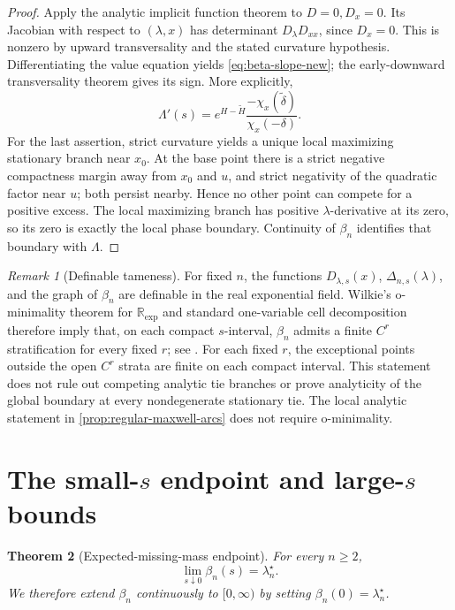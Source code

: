\documentclass[11pt]{article}
\theoremstyle{plain}
\newtheorem{theorem}{Theorem}[section]
\theoremstyle{definition}
\theoremstyle{remark}
\newtheorem{remark}[theorem]{Remark}
\newcommand{\R}{\mathbb R}
\begin{document}
\begin{proof}
Apply the analytic implicit function theorem to \(D=0,D_x=0\).  Its Jacobian
with respect to \((\lambda,x)\) has determinant \(D_\lambda D_{xx}\), since
\(D_x=0\).  This is nonzero by upward transversality and the stated curvature
hypothesis.  Differentiating the value equation yields \eqref{eq:beta-slope-new};
the early-downward transversality theorem gives its sign.  More explicitly,
\begin{equation}\label{eq:beta-slope-chi}
\Lambda'(s)=e^{H-\widetilde H}
\frac{-\chi_x(\widetilde\delta)}{\chi_x(-\delta)}.
\end{equation}
For the last assertion, strict curvature yields a unique local maximizing
stationary branch near \(x_0\).  At the base point there is a strict negative
compactness margin away from \(x_0\) and \(u\), and strict negativity of the
quadratic factor near \(u\); both persist nearby.  Hence no other point can
compete for a positive excess.  The local maximizing branch has positive
\(\lambda\)-derivative at its zero, so its zero is exactly the local phase
boundary.  Continuity of \(\beta_n\) identifies that boundary with \(\Lambda\).
\end{proof}

\begin{remark}[Definable tameness]\label{rem:definable}
For fixed \(n\), the functions \(D_{\lambda,s}(x)\), \(\Delta_{n,s}(\lambda)\), and the graph of \(\beta_n\) are definable in the real exponential field.  Wilkie's o-minimality theorem for \(\R_{\exp}\) and standard one-variable cell decomposition therefore imply that, on each compact \(s\)-interval, \(\beta_n\) admits a finite \(C^r\) stratification for every fixed \(r\); see \cite{Wilkie1996,vanDenDries1998}.  For each fixed \(r\), the exceptional points outside the open \(C^r\) strata are finite on each compact interval.  This statement does not rule out competing analytic tie branches or prove analyticity of the global boundary at every nondegenerate stationary tie.  The local analytic statement in \cref{prop:regular-maxwell-arcs} does not require o-minimality.
\end{remark}

\section{The small-\texorpdfstring{$s$}{s} endpoint and large-\texorpdfstring{$s$}{s} bounds}

\begin{theorem}[Expected-missing-mass endpoint]\label{thm:beta-zero-new}
For every \(n\ge2\),
\begin{equation}\label{eq:beta-zero-new}
\lim_{s\downarrow0}\beta_n(s)=\lambda_n^\star.
\end{equation}
We therefore extend \(\beta_n\) continuously to \([0,\infty)\) by setting \(\beta_n(0)=\lambda_n^\star\).
\end{theorem}
\end{document}
